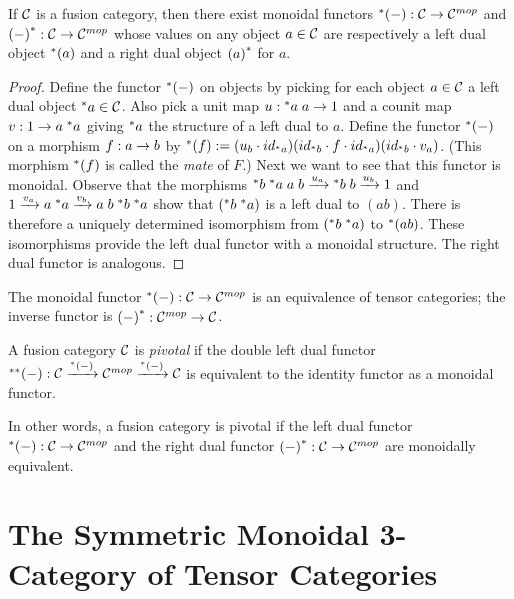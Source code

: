 \documentclass{amsart}
\begin{document}
\begin{proposition}
If $\mathcal C$ is a fusion category, then there exist monoidal functors ${}^*{(-)} : \mathcal C \rightarrow \mathcal C^{{mop}}$ and ${(-)}^* : \mathcal C \rightarrow \mathcal C^{{mop}}$ whose values on any object $a \in \mathcal C$ are respectively a left dual object ${}^*{(a)}$ and a right dual object ${(a)}^*$ for $a$.
\end{proposition}

\begin{proof}
Define the functor ${}^*{(-)}$ on objects by picking for each object $a \in \mathcal C$ a left dual object ${}^*{a} \in \mathcal C$.  Also pick a unit map $u: {}^*{a} \; a \rightarrow 1$ and a counit map $v: 1 \rightarrow a \; {}^*{a}$ giving ${}^*{a}$ the structure of a left dual to $a$.  Define the functor ${}^*{(-)}$ on a morphism $f: a \rightarrow b$ by ${}^*{(f)} := (u_b \cdot {id}_{{}^*{a}}) ({id}_{{}^*{b}} \cdot f \cdot {id}_{{}^*{a}}) ({id}_{{}^*{b}} \cdot v_a)$.  (This morphism ${}^*{(f)}$ is called the \emph{mate} of $F$.)  Next we want to see that this functor is monoidal.  Observe that the morphisms ${}^*{b} \; {}^*{a} \; a \; b \xrightarrow{u_a} {}^*{b} \; b \xrightarrow{u_b} 1$ and $1 \xrightarrow{v_a} a \; {}^*{a} \xrightarrow{v_b} a \; b \; {}^*{b} \; {}^*{a}$ show that $({}^*{b} \; {}^*{a})$ is a left dual to $(a b)$.  There is therefore a uniquely determined isomorphism from $({}^*{b} \; {}^*{a})$ to ${}^*{(a b)}$.  These isomorphisms provide the left dual functor with a monoidal structure.  The right dual functor is analogous.  %
\end{proof}

\begin{remark}
The monoidal functor ${}^*{(-)}: \mathcal C \rightarrow \mathcal C^{{mop}}$ is an equivalence of tensor categories; the inverse functor is ${(-)}^*: \mathcal C^{{mop}} \rightarrow \mathcal C$.
\end{remark}

\begin{definition}
A fusion category $\mathcal C$ is \emph{pivotal} if the double left dual functor ${}^{**}{(-)}: \mathcal C \xrightarrow{{}^*{(-)}} \mathcal C^{{mop}} \xrightarrow{{}^*{(-)}} \mathcal C$ is equivalent to the identity functor as a monoidal functor.
\end{definition}

In other words, a fusion category is pivotal if the left dual functor ${}^*{(-)}: \mathcal C \rightarrow \mathcal C^{{mop}}$ and the right dual functor ${(-)}^*: \mathcal C \rightarrow \mathcal C^{{mop}}$ are monoidally equivalent.


\section{The Symmetric Monoidal 3-Category of Tensor Categories}
\end{document}
